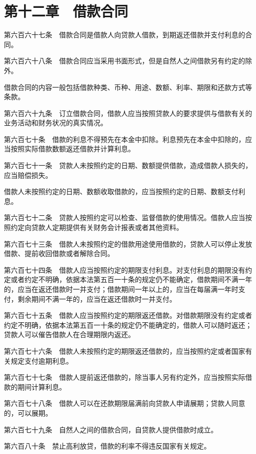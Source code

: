 \documentclass[UTF8,12pt,a4paper]{ctexbook}
\begin{document}
\section*{第十二章　借款合同}

第六百六十七条　借款合同是借款人向贷款人借款，到期返还借款并支付利息的合同。

第六百六十八条　借款合同应当采用书面形式，但是自然人之间借款另有约定的除外。

借款合同的内容一般包括借款种类、币种、用途、数额、利率、期限和还款方式等条款。

第六百六十九条　订立借款合同，借款人应当按照贷款人的要求提供与借款有关的业务活动和财务状况的真实情况。

第六百七十条　借款的利息不得预先在本金中扣除。利息预先在本金中扣除的，应当按照实际借款数额返还借款并计算利息。

第六百七十一条　贷款人未按照约定的日期、数额提供借款，造成借款人损失的，应当赔偿损失。

借款人未按照约定的日期、数额收取借款的，应当按照约定的日期、数额支付利息。

第六百七十二条　贷款人按照约定可以检查、监督借款的使用情况。借款人应当按照约定向贷款人定期提供有关财务会计报表或者其他资料。

第六百七十三条　借款人未按照约定的借款用途使用借款的，贷款人可以停止发放借款、提前收回借款或者解除合同。

第六百七十四条　借款人应当按照约定的期限支付利息。对支付利息的期限没有约定或者约定不明确，依据本法第五百一十条的规定仍不能确定，借款期间不满一年的，应当在返还借款时一并支付；借款期间一年以上的，应当在每届满一年时支付，剩余期间不满一年的，应当在返还借款时一并支付。

第六百七十五条　借款人应当按照约定的期限返还借款。对借款期限没有约定或者约定不明确，依据本法第五百一十条的规定仍不能确定的，借款人可以随时返还；贷款人可以催告借款人在合理期限内返还。

第六百七十六条　借款人未按照约定的期限返还借款的，应当按照约定或者国家有关规定支付逾期利息。

第六百七十七条　借款人提前返还借款的，除当事人另有约定外，应当按照实际借款的期间计算利息。

第六百七十八条　借款人可以在还款期限届满前向贷款人申请展期；贷款人同意的，可以展期。

第六百七十九条　自然人之间的借款合同，自贷款人提供借款时成立。

第六百八十条　禁止高利放贷，借款的利率不得违反国家有关规定。
\end{document}
